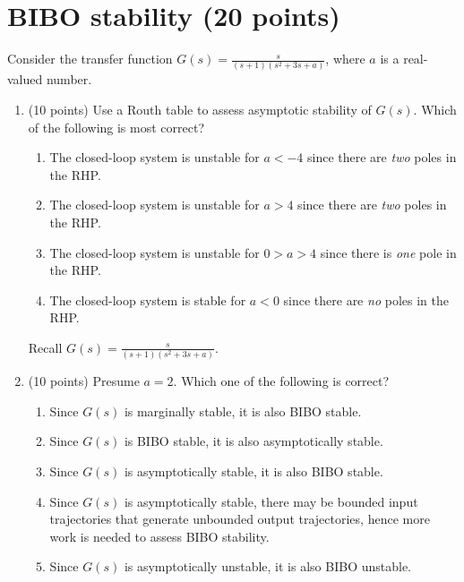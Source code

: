 \documentclass[11pt]{article}
\begin{document}

\section{BIBO stability (20 points)}
Consider the transfer function \( G(s)=\displaystyle\frac{s}{(s+1)(s^2 + 3s + a)} \), where \(a\) is a real-valued number.
\begin{enumerate}
    \item (10 points) Use a Routh table to assess asymptotic stability of \( G(s)\). Which of the following is most correct?
    \begin{enumerate}
        \item The closed-loop system is unstable for \(a<-4\) since there are \textit{two} poles in the RHP.
        \item The closed-loop system is unstable for \(a>4\) since there are \textit{two} poles in the RHP.
        \item The closed-loop system is unstable for \(0>a>4\) since there is \textit{one} pole in the RHP.
        \item The closed-loop system is stable for \(a<0\) since there are \textit{no} poles in the RHP.
    \end{enumerate}\newpage
    Recall \( G(s)=\displaystyle\frac{s}{(s+1)(s^2 + 3s + a)} \).
    \item (10 points) Presume \(a= 2\). Which one of the following is correct?
    \begin{enumerate}
        \item Since \(G(s)\) is marginally stable, it is also BIBO stable.
        \item Since \(G(s)\) is BIBO stable, it is also asymptotically stable.
        \item Since \(G(s)\) is asymptotically stable, it is also BIBO stable.
        \item Since \(G(s)\) is asymptotically stable, there may be bounded input trajectories that generate unbounded output trajectories, hence more work is needed to assess BIBO stability.
        \item Since \(G(s)\) is asymptotically unstable, it is also BIBO unstable.
    \end{enumerate}
\end{enumerate}\newpage
\end{document}
